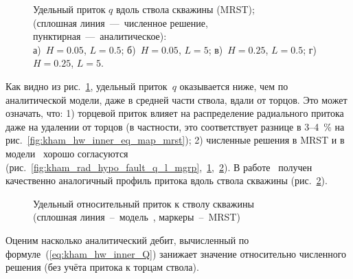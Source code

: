 \documentclass{article}
\begin{document}
\begin{figure}[H]
	\caption{
		Удельный приток $q$ вдоль ствола скважины (MRST); \\
		(сплошная линия~---~численное решение, пунктирная~---~аналитическое): \\
		а)~$H=0.05$, $L=0.5$; б)~$H=0.05$, $L=5$;
		в)~$H=0.25$, $L=0.5$; г)~$H=0.25$, $L=5$.
	}
	\label{fig:kham_rad_hypo_fault_q_l_mrst}
\end{figure}

Как видно из рис.~\ref{fig:kham_rad_hypo_fault_q_l_mrst}, удельный приток~$q$
оказывается ниже, чем по аналитической модели, даже в средней части ствола, вдали от торцов.
Это может означать, что: 1) торцевой приток влияет на распределение радиального притока
даже на удалении от торцов (в частности, это соответствует разнице в 3--4~\% на рис.~\ref{fig:kham_hw_inner_eq_map_mrst});
2) численные решения в MRST и в модели~\cite{lit:kham_mazo_uzku_2015} хорошо согласуются
(рис.~\ref{fig:kham_rad_hypo_fault_q_l_mgrp},~\ref{fig:kham_rad_hypo_fault_q_l_mrst},~\ref{fig:kham_well_along_ql_H015_L5_rw0001_mgrp_mrst}).
В работе~\cite{lit:kham_ozkan1999} получен качественно аналогичный профиль притока вдоль ствола скважины (рис.~\ref{fig:kham_well_along_ql_H015_L5_rw0001_mgrp_mrst}).

\begin{figure}[H]
	\centering
	
	\caption{Удельный относительный приток к стволу скважины \\
		(сплошная линия~--~модель~\cite{lit:kham_mazo_uzku_2015}, маркеры~--~MRST)}
	\label{fig:kham_well_along_ql_H015_L5_rw0001_mgrp_mrst}
\end{figure}

Оценим насколько аналитический дебит, вычисленный по формуле~(\ref{eq:kham_hw_inner_Q})
занижает значение относительно численного решения (без учёта притока к торцам ствола).
\end{document}
